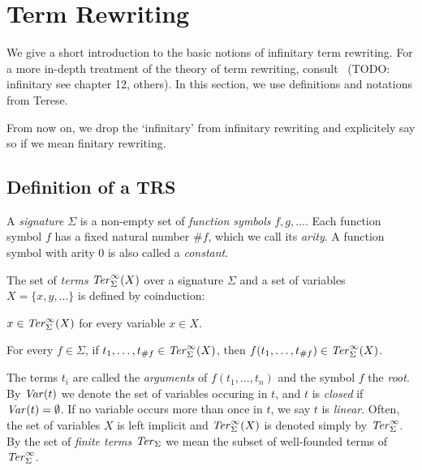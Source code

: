\section{Term Rewriting}\label{sec:rewriting}


We give a short introduction to the basic notions of infinitary term
rewriting. For a more in-depth treatment of the theory of term rewriting,
consult~\cite{terese-03} (TODO: infinitary see chapter 12, others). In this
section, we use definitions and notations from Terese.

From now on, we drop the `infinitary' from infinitary rewriting and
explicitely say so if we mean finitary rewriting.


\subsection{Definition of a TRS}\label{sub:trs}

\begin{definition}%
A \emph{signature} $\Sigma$ is a non-empty set of \emph{function symbols} $f,
g, \ldots$. Each function symbol $f$ has a fixed natural number $\#f$, which
we call its \emph{arity}. A function symbol with arity $0$ is also called a
\emph{constant}.
\end{definition}

\begin{definition}%
The set of \emph{terms} $\mathit{Ter}_\Sigma^\infty(X)$ over a signature $\Sigma$ and a
set of variables $X = \{x, y, \ldots\}$ is defined by coinduction:
\begin{compactenum}
  \item
    $x \in \mathit{Ter}_\Sigma^\infty(X)$ for every variable $x \in X$.
  \item
    For every $f \in \Sigma$, if $t_1, \ldots, t_{\#f} \in \mathit{Ter}_\Sigma^\infty(X)$,
    then $f(t_1, \ldots, t_{\#f}) \in \mathit{Ter}_\Sigma^\infty(X)$.
\end{compactenum}
\end{definition}

The terms $t_i$ are called the \emph{arguments} of $f(t_1, \ldots, t_n)$ and
the symbol $f$ the \emph{root}. By $\mathit{Var}(t)$ we denote the set of variables
occuring in $t$, and $t$ is \emph{closed} if $\mathit{Var}(t) = \emptyset$. If no
variable occurs more than once in $t$, we say $t$ is \emph{linear}.
Often, the set of variables $X$ is left implicit and $\mathit{Ter}_\Sigma^\infty(X)$ is
denoted simply by $\mathit{Ter}_\Sigma^\infty$. By the set of \emph{finite terms} $\mathit{Ter}_\Sigma$ we
mean the subset of well-founded terms of $\mathit{Ter}_\Sigma^\infty$.

